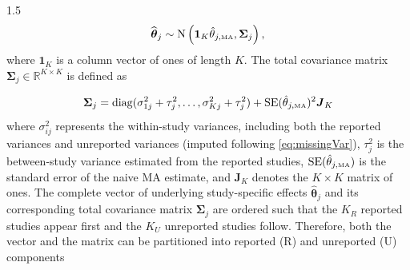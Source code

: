 \documentclass{article}
\begin{document}
\begin{spacing}{1.5}
\begin{equation*}
\widehat{\boldsymbol{\theta}}_j \sim \operatorname{N}\left( \boldsymbol{1}_K \hat{\theta}_{j,\tiny{\mbox{MA}}}, \boldsymbol{\Sigma}_j \right),
\end{equation*}
where $\boldsymbol{1}_K$ is a column vector of ones of length $K$. The total covariance matrix $\boldsymbol{\Sigma}_j \in \mathbb{R}^{K \times K}$ is defined as

\begin{equation*} \label{eq:sigma_uni}
\boldsymbol{\Sigma}_j = \operatorname{diag} (\sigma_{1j}^2 + \tau_j^2, \dots, \sigma_{Kj}^2 + \tau_j^2) + \mbox{{SE}}(\hat\theta_{j, \tiny{\mbox{MA}}})^2 \boldsymbol{J}_K
\end{equation*}
where $\sigma_{ij}^2$ represents the within-study variances, including both the reported variances and unreported variances (imputed following \eqref{eq:missingVar}), $\tau_j^2$ is the between-study variance estimated from the reported studies, 
$\mbox{{SE}}(\hat\theta_{j, \tiny{\mbox{MA}}})$ is the standard error of the naive MA estimate, and $\boldsymbol{J}_K$ denotes the 
$K \times K$ matrix of ones. The complete vector of underlying study-specific effects $\widehat{\boldsymbol{\theta}}_j$ and its corresponding total covariance matrix $ \boldsymbol{\Sigma}_j$ are ordered such that the $K_R$ reported studies appear first and the $K_U$ unreported studies follow. Therefore, both the vector and the matrix can be partitioned into reported (R) and unreported (U) components



\end{spacing}
\end{document}
